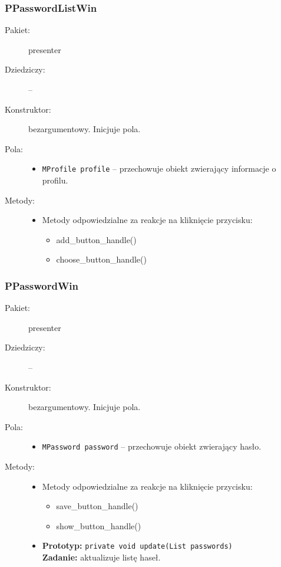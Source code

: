 \documentclass[a4paper]{article}
\newcommand{\prog}{\texttt}
\begin{document}
\subsubsection{PPasswordListWin}
\begin{description}
    \item[Pakiet:] presenter
    \item[Dziedziczy:] --
    \item[Konstruktor:] bezargumentowy. Inicjuje pola.
    \item[Pola:] \hfill
    \begin{itemize}
        \item \prog{MProfile profile} -- przechowuje obiekt zwierający informacje o profilu.
    \end{itemize}
    \item[Metody:] \hfill
    \begin{itemize}
        \item Metody odpowiedzialne za reakcje na kliknięcie przycisku:
        \begin{itemize}
            \item add\_button\_handle()
            \item choose\_button\_handle()
        \end{itemize}
    \end{itemize}
\end{description}

\subsubsection{PPasswordWin}
\begin{description}
    \item[Pakiet:] presenter
    \item[Dziedziczy:] --
    \item[Konstruktor:] bezargumentowy. Inicjuje pola.
    \item[Pola:] \hfill
    \begin{itemize}
        \item \prog{MPassword password} -- przechowuje obiekt zwierający hasło.
    \end{itemize}
    \item[Metody:] \hfill
    \begin{itemize}
        \item Metody odpowiedzialne za reakcje na kliknięcie przycisku:
        \begin{itemize}
            \item save\_button\_handle()
            \item show\_button\_handle()
        \end{itemize}
        \item \textbf{Prototyp:} \prog{private void update(List passwords)}\\\textbf{Zadanie:} aktualizuje listę haseł.
    \end{itemize}
\end{description}
\end{document}
